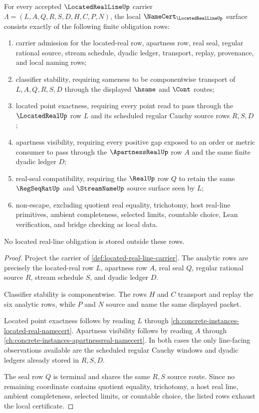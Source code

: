 \begin{theorem}
\label{thm:located-real-line-namecert-obligations}
For every accepted $\LocatedRealLineUp$ carrier $\Lambda=(L,A,Q,R,S,D,H,C,P,N)$, the local $\NameCert_{\LocatedRealLineUp}$ surface consists exactly of the following finite obligation rows:
\begin{enumerate}
\item carrier admission for the located-real row, apartness row, real seal, regular rational source, stream schedule, dyadic ledger, transport, replay, provenance, and local naming rows;
\item classifier stability, requiring sameness to be componentwise transport of $L,A,Q,R,S,D$ through the displayed $\hsame$ and $\Cont$ routes;
\item located point exactness, requiring every point read to pass through the $\LocatedRealUp$ row $L$ and its scheduled regular Cauchy source rows $R,S,D$;
\item apartness visibility, requiring every positive gap exposed to an order or metric consumer to pass through the $\ApartnessRealUp$ row $A$ and the same finite dyadic ledger $D$;
\item real-seal compatibility, requiring the $\RealUp$ row $Q$ to retain the same $\RegSeqRatUp$ and $\StreamNameUp$ source surface seen by $L$;
\item non-escape, excluding quotient real equality, trichotomy, host real-line primitives, ambient completeness, selected limits, countable choice, Lean verification, and bridge checking as local data.
\end{enumerate}
No located real-line obligation is stored outside these rows.
\end{theorem}
\begin{proof}
Project the carrier of \autoref{def:located-real-line-carrier}. The analytic rows are precisely the located-real row $L$, apartness row $A$, real seal $Q$, regular rational source $R$, stream schedule $S$, and dyadic ledger $D$.

Classifier stability is componentwise. The rows $H$ and $C$ transport and replay the six analytic rows, while $P$ and $N$ source and name the same displayed packet.

Located point exactness follows by reading $L$ through \autoref{ch:concrete-instances-located-real-namecert}. Apartness visibility follows by reading $A$ through \autoref{ch:concrete-instances-apartnessreal-namecert}. In both cases the only line-facing observations available are the scheduled regular Cauchy windows and dyadic ledgers already stored in $R,S,D$.

The seal row $Q$ is terminal and shares the same $R,S$ source route. Since no remaining coordinate contains quotient equality, trichotomy, a host real line, ambient completeness, selected limits, or countable choice, the listed rows exhaust the local certificate.
\end{proof}

